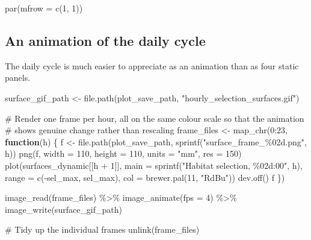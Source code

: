\documentclass[
  letterpaper,
  DIV=11,
  numbers=noendperiod]{scrartcl}
\newenvironment{Shaded}{\begin{snugshade}}{\end{snugshade}}
\newcommand{\AttributeTok}[1]{\textcolor[rgb]{0.40,0.45,0.13}{#1}}
\newcommand{\CommentTok}[1]{\textcolor[rgb]{0.37,0.37,0.37}{#1}}
\newcommand{\ControlFlowTok}[1]{\textcolor[rgb]{0.00,0.23,0.31}{\textbf{#1}}}
\newcommand{\DecValTok}[1]{\textcolor[rgb]{0.68,0.00,0.00}{#1}}
\newcommand{\FunctionTok}[1]{\textcolor[rgb]{0.28,0.35,0.67}{#1}}
\newcommand{\NormalTok}[1]{\textcolor[rgb]{0.00,0.23,0.31}{#1}}
\newcommand{\OtherTok}[1]{\textcolor[rgb]{0.00,0.23,0.31}{#1}}
\newcommand{\SpecialCharTok}[1]{\textcolor[rgb]{0.37,0.37,0.37}{#1}}
\newcommand{\StringTok}[1]{\textcolor[rgb]{0.13,0.47,0.30}{#1}}
\begin{document}
\begin{Shaded}
\begin{Highlighting}[]
\FunctionTok{par}\NormalTok{(}\AttributeTok{mfrow =} \FunctionTok{c}\NormalTok{(}\DecValTok{1}\NormalTok{, }\DecValTok{1}\NormalTok{))}
\end{Highlighting}
\end{Shaded}

\subsection{An animation of the daily
cycle}\label{an-animation-of-the-daily-cycle}

The daily cycle is much easier to appreciate as an animation than as
four static panels.

\begin{Shaded}
\begin{Highlighting}[]
\NormalTok{surface\_gif\_path }\OtherTok{\textless{}{-}} \FunctionTok{file.path}\NormalTok{(plot\_save\_path, }\StringTok{"hourly\_selection\_surfaces.gif"}\NormalTok{)}

\CommentTok{\# Render one frame per hour, all on the same colour scale so that the animation}
\CommentTok{\# shows genuine change rather than rescaling}
\NormalTok{frame\_files }\OtherTok{\textless{}{-}} \FunctionTok{map\_chr}\NormalTok{(}\DecValTok{0}\SpecialCharTok{:}\DecValTok{23}\NormalTok{, }\ControlFlowTok{function}\NormalTok{(h) \{}
\NormalTok{  f }\OtherTok{\textless{}{-}} \FunctionTok{file.path}\NormalTok{(plot\_save\_path, }\FunctionTok{sprintf}\NormalTok{(}\StringTok{"surface\_frame\_\%02d.png"}\NormalTok{, h))}
  \FunctionTok{png}\NormalTok{(f, }\AttributeTok{width =} \DecValTok{110}\NormalTok{, }\AttributeTok{height =} \DecValTok{110}\NormalTok{, }\AttributeTok{units =} \StringTok{"mm"}\NormalTok{, }\AttributeTok{res =} \DecValTok{150}\NormalTok{)}
  \FunctionTok{plot}\NormalTok{(surfaces\_dynamic[[h }\SpecialCharTok{+} \DecValTok{1}\NormalTok{]],}
       \AttributeTok{main =} \FunctionTok{sprintf}\NormalTok{(}\StringTok{"Habitat selection, \%02d:00"}\NormalTok{, h),}
       \AttributeTok{range =} \FunctionTok{c}\NormalTok{(}\SpecialCharTok{{-}}\NormalTok{sel\_max, sel\_max), }\AttributeTok{col =} \FunctionTok{brewer.pal}\NormalTok{(}\DecValTok{11}\NormalTok{, }\StringTok{"RdBu"}\NormalTok{))}
  \FunctionTok{dev.off}\NormalTok{()}
\NormalTok{  f}
\NormalTok{\})}

\FunctionTok{image\_read}\NormalTok{(frame\_files) }\SpecialCharTok{\%\textgreater{}\%}
  \FunctionTok{image\_animate}\NormalTok{(}\AttributeTok{fps =} \DecValTok{4}\NormalTok{) }\SpecialCharTok{\%\textgreater{}\%}
  \FunctionTok{image\_write}\NormalTok{(surface\_gif\_path)}

\CommentTok{\# Tidy up the individual frames}
\FunctionTok{unlink}\NormalTok{(frame\_files)}
\end{Highlighting}
\end{Shaded}
\end{document}
